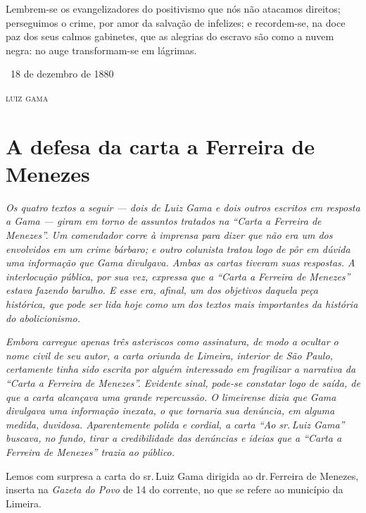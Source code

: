 Lembrem-se os evangelizadores do positivismo que nós não atacamos
direitos; perseguimos o crime, por amor da salvação de infelizes; e
recordem-se, na doce paz dos seus calmos gabinetes, que as alegrias do
escravo são como a nuvem negra: no auge transformam-se em lágrimas.

\medskip

\hfill\ 18 de dezembro de 1880

\hfill\textsc{luiz gama}

\part{A defesa da carta a Ferreira de Menezes}

\begin{didas}
\emph{Os quatro textos a seguir --- dois de Luiz Gama e dois outros
escritos em resposta a Gama --- giram em torno de assuntos tratados na
``Carta a Ferreira de Menezes''. Um comendador corre à imprensa para
dizer que não era um dos envolvidos em um crime bárbaro; e outro
colunista tratou logo de pôr em dúvida uma informação que Gama
divulgava. Ambas as cartas tiveram suas respostas. A interlocução
pública, por sua vez, expressa que a ``Carta a Ferreira de Menezes''
estava fazendo barulho. E esse era, afinal, um dos objetivos
daquela peça histórica, que pode ser lida hoje como um dos textos mais
importantes da história do abolicionismo.}
\end{didas}


\begin{resumo}
\emph{Embora carregue apenas três asteriscos como assinatura, de modo a
ocultar o nome civil de seu autor, a carta oriunda de Limeira, interior
de São Paulo, certamente tinha sido escrita por alguém interessado em
fragilizar a narrativa da ``Carta a Ferreira de Menezes''. Evidente
sinal, pode-se constatar logo de saída, de que a carta alcançava uma
grande repercussão. O limeirense dizia que Gama divulgava uma informação
inexata, o que tornaria sua denúncia, em alguma medida, duvidosa.
Aparentemente polida e cordial, a carta ``Ao sr.\,Luiz Gama'' buscava, no
fundo, tirar a credibilidade das denúncias e ideias que a ``Carta a
Ferreira de Menezes'' trazia ao público. }
\end{resumo}

Lemos com surpresa a carta do sr.\,Luiz Gama dirigida ao dr.\,Ferreira de
Menezes, inserta na \emph{Gazeta do Povo} de 14 do corrente, no que se
refere ao município da Limeira.

